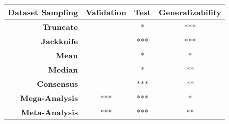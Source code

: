 \begin{tabular}{rccc}
\textbf{Dataset Sampling}  & \textbf{Validation} &      \textbf{Test} & \textbf{Generalizability} \\
\hline
\textbf{Truncate}          &                     &    {\color{red} *} &                       *** \\
\textbf{Jackknife}         &                     &  {\color{red} ***} &                       *** \\
\textbf{Mean}              &                     &    {\color{red} *} &                         * \\
\textbf{Median}            &                     &    {\color{red} *} &                        ** \\
\textbf{Consensus}         &                     &  {\color{red} ***} &                        ** \\
\textbf{Mega-Analysis}     &                ***  &                *** &                         * \\
\textbf{Meta-Analysis}     &                ***  &                *** &                        ** \\
\end{tabular}
